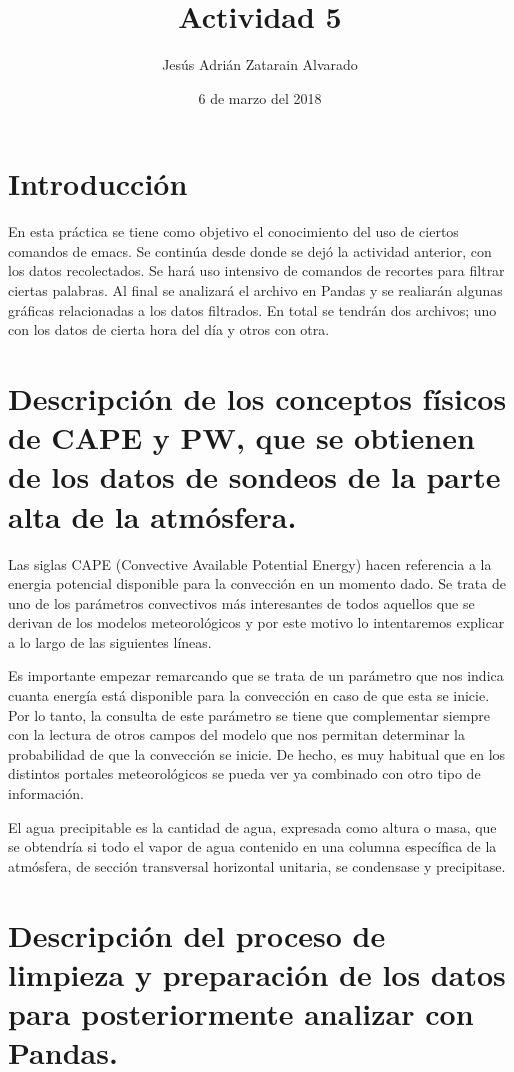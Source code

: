 \documentclass{article}
\title{Actividad 5}
\author{Jesús Adrián Zatarain Alvarado}
\date{6 de marzo del 2018}
\begin{document}
\maketitle

\section{Introducción}

En esta práctica se tiene como objetivo el conocimiento del uso de ciertos comandos de emacs. Se continúa desde donde se dejó la actividad anterior, con los datos recolectados. Se hará uso intensivo de comandos de recortes para filtrar ciertas palabras. Al final se analizará el archivo en Pandas y se realiarán algunas gráficas relacionadas a los datos filtrados. En total se tendrán dos archivos; uno con los datos de cierta hora del día y otros con otra.

\section{Descripción de los conceptos físicos de CAPE y PW, que se obtienen de los datos de sondeos de la parte alta de la atmósfera.}

Las siglas CAPE (Convective Available Potential Energy) hacen referencia a la energia potencial disponible para la convección en un momento dado. Se trata de uno de los parámetros convectivos más interesantes de todos aquellos que se derivan de los modelos meteorológicos y por este motivo lo intentaremos explicar a lo largo de las siguientes líneas.

Es importante empezar remarcando que se trata de un parámetro que nos indica cuanta energía está disponible para la convección en caso de que esta se inicie. Por lo tanto, la consulta de este parámetro se tiene que complementar siempre con la lectura de otros campos del modelo que nos permitan determinar la probabilidad de que la convección se inicie. De hecho, es muy habitual que en los distintos portales meteorológicos se pueda ver ya combinado con otro tipo de información. 

El agua precipitable es la cantidad de agua, expresada como altura o masa, que se obtendría si todo el vapor de agua contenido en una columna específica de la atmósfera, de sección transversal horizontal unitaria, se condensase y precipitase.

\section{Descripción del proceso de limpieza y preparación de los datos para posteriormente analizar con Pandas.}
\end{document}
